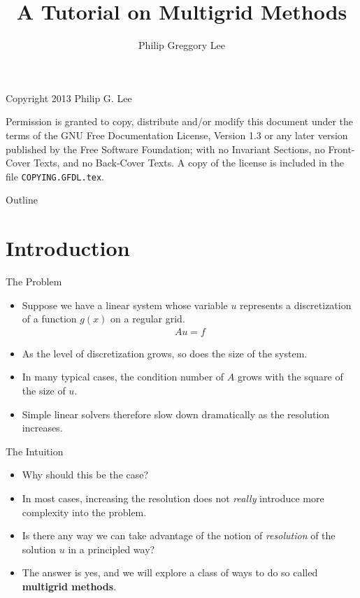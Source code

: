 \documentclass{beamer}
\title{A Tutorial on Multigrid Methods}
\author{Philip Greggory Lee}
\institute{
 Electrical Engineering and Computer Science\\
 Northwestern University\\
 Evanston, IL 60208
}
\begin{document}
\begin{frame}
 \titlepage
\end{frame}

\begin{frame}{Copyright 2013 Philip G. Lee}
 \begin{center}
 Permission is granted to copy, distribute and/or modify this document
 under the terms of the GNU Free Documentation License, Version 1.3
 or any later version published by the Free Software Foundation;
 with no Invariant Sections, no Front-Cover Texts, and no Back-Cover Texts.
 A copy of the license is included in the file \texttt{COPYING.GFDL.tex}.
 \end{center}
\end{frame}

\begin{frame}{Outline}
 \tableofcontents
\end{frame}
\addtocounter{framenumber}{-1}

\section{Introduction}%

\begin{frame}{The Problem}
 \begin{itemize}
  \item Suppose we have a linear system whose variable $u$ represents a discretization
        of a function $g(x)$ on a regular grid.
  \begin{align}
   Au=f
  \end{align}
  \item As the level of discretization grows, so does the size of the system.
  \item In many typical cases, the condition number of $A$ grows with the
        square of the size of $u$.
  \item Simple linear solvers therefore slow down dramatically as the resolution
        increases.
 \end{itemize}
\end{frame}

\begin{frame}{The Intuition}
 \begin{itemize}
  \item Why should this be the case?
  \item In most cases, increasing the resolution does not \textit{really}
        introduce more complexity into the problem.
  \item Is there any way we can take advantage of the notion of
        \textit{resolution} of the solution $u$ in a principled way?
  \item The answer is yes, and we will explore a class of ways to do so called
        \textbf{multigrid methods}.
 \end{itemize}
\end{frame}
\end{document}
